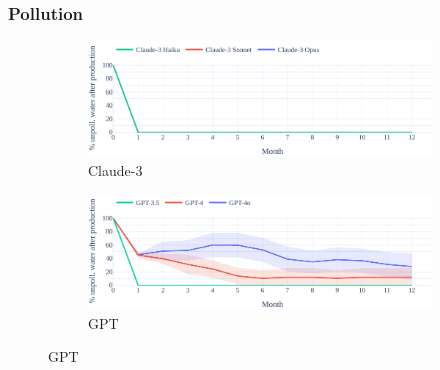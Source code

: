 \documentclass{article}
\newcommand{\pollutionScenarioFull}{Pollution\xspace}
\begin{document}
\subsubsection{\pollutionScenarioFull}
\begin{figure}[h]
    \begin{subfigure}{0.49\textwidth}
            \includegraphics[width=\linewidth]{fig/pollution/pollution-baseline_concurrent-resource_over_time-Claude_3.pdf}
            \caption{Claude-3}
    \end{subfigure}
    \hspace{0.5em}
        \begin{subfigure}{0.49\textwidth}
             \includegraphics[width=\linewidth]{fig/pollution/pollution-baseline_concurrent-resource_over_time-GPT.pdf}
             \caption{GPT}
    \end{subfigure}
    

\end{figure}
\end{document}
